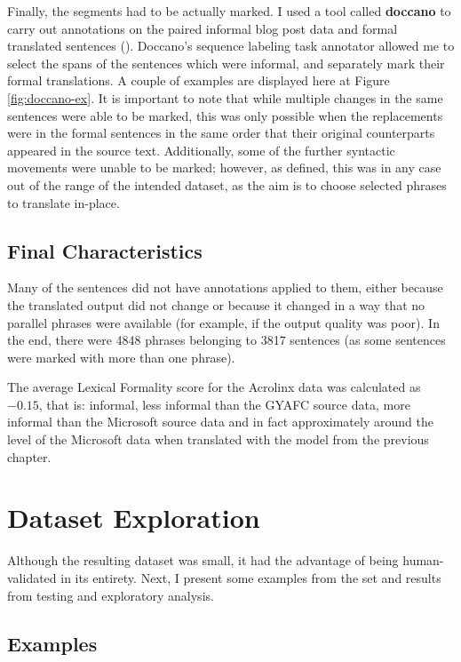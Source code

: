 Finally, the segments had to be actually marked. I used a tool called \textbf{doccano} to carry out annotations on the paired informal blog post data and formal translated sentences (\cite{doccano2019}). Doccano's sequence labeling task annotator allowed me to select the spans of the sentences which were informal, and separately mark their formal translations. A couple of examples are displayed here at Figure \ref{fig:doccano-ex}. It is important to note that while multiple changes in the same sentences were able to be marked, this was only possible when the replacements were in the formal sentences in the same order that their original counterparts appeared in the source text. Additionally, some of the further syntactic movements were unable to be marked; however, as defined, this was in any case out of the range of the intended dataset, as the aim is to choose selected phrases to translate in-place.

\subsection{Final Characteristics}

Many of the sentences did not have annotations applied to them, either because the translated output did not change or because it changed in a way that no parallel phrases were available (for example, if the output quality was poor). In the end, there were 4848 phrases belonging to 3817 sentences (as some sentences were marked with more than one phrase).

The average Lexical Formality score for the Acrolinx data was calculated as $-0.15$, that is: informal, less informal than the GYAFC source data, more informal than the Microsoft source data and in fact approximately around the level of the Microsoft data when translated with the model from the previous chapter.

\section{Dataset Exploration}

Although the resulting dataset was small, it had the advantage of being human-validated in its entirety. Next, I present some examples from the set and results from testing and exploratory analysis.

\subsection{Examples}

